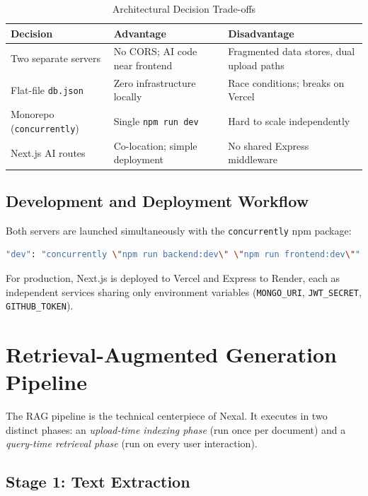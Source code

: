 \documentclass[conference]{IEEEtran}
\begin{document}
\begin{table}[H]
\centering
\caption{Architectural Decision Trade-offs}
\label{tab:arch_tradeoffs}
\renewcommand{\arraystretch}{1.2}
\begin{tabularx}{\linewidth}{@{}lXX@{}}
\toprule
\textbf{Decision} & \textbf{Advantage} & \textbf{Disadvantage} \\
\midrule
Two separate servers & No CORS; AI code near frontend & Fragmented data stores, dual upload paths \\
Flat-file \texttt{db.json} & Zero infrastructure locally & Race conditions; breaks on Vercel \\
Monorepo (\texttt{concurrently}) & Single \texttt{npm run dev} & Hard to scale independently \\
Next.js AI routes & Co-location; simple deployment & No shared Express middleware \\
\bottomrule
\end{tabularx}
\end{table}

\subsection{Development and Deployment Workflow}

Both servers are launched simultaneously with the \texttt{concurrently} npm package:

\begin{lstlisting}[language=bash, caption={Concurrent server startup via npm script}]
"dev": "concurrently \"npm run backend:dev\" \"npm run frontend:dev\""
\end{lstlisting}

For production, Next.js is deployed to Vercel and Express to Render, each as independent services sharing only environment variables (\texttt{MONGO\_URI}, \texttt{JWT\_SECRET}, \texttt{GITHUB\_TOKEN}).

\section{Retrieval-Augmented Generation Pipeline}
\label{sec:rag}

The RAG pipeline is the technical centerpiece of Nexal. It executes in two distinct phases: an \emph{upload-time indexing phase} (run once per document) and a \emph{query-time retrieval phase} (run on every user interaction).

\subsection{Stage 1: Text Extraction}
\end{document}
